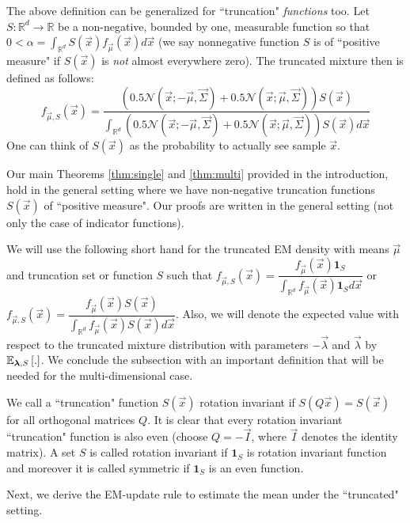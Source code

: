 The above definition can be generalized for ``truncation" \textit{functions} too. Let $S : \mathbb{R}^d \to \mathbb{R}$ be a non-negative, bounded by one, measurable function so that $0< \alpha = \int_{\mathbb{R}^d} S(\vec{x}) f_{\vec{\mu}}(\vec{x})d\vec{x}$ (we say nonnegative function $S$ is of ``positive measure" if $S(\vec{x})$ is \textit{not} almost everywhere zero). The truncated mixture then is defined as follows:
\[f_{\vec{\mu},S}(\vec{x})= \dfrac{(0.5\mathcal{N}(\vec{x};-\vec{\mu},\vec{\Sigma})+0.5\mathcal{N}(\vec{x};\vec{\mu},\vec{\Sigma}))S(\vec{x})}{\int_{\mathbb{R}^d}(0.5\mathcal{N}(\vec{x};-\vec{\mu},\vec{\Sigma})+0.5\mathcal{N}(\vec{x};\vec{\mu},\vec{\Sigma}))S(\vec{x}) d\vec{x}}
\]
One can think of $S(\vec{x})$ as the probability to actually see sample $\vec{x}$.
\begin{remark}
Our main Theorems \ref{thm:single} and \ref{thm:multi} provided in the introduction, hold in the general setting where we have non-negative truncation functions $S(\vec{x})$ of ``positive measure". Our proofs are written in the general setting (not only the case of indicator functions).
\end{remark}

We will use the following short hand for the truncated EM density with means $\vec{\mu}$ and truncation set or function $S$ such that
$f_{\vec{\mu},S}(\vec{x})=\dfrac{f_{\vec{\mu}}(\vec{x}) \mathbf{1}_{S}}{\int_{\mathbb{R}^d} f_{\vec{\mu}}(\vec{x})\mathbf{1}_S d\vec{x}}$ or $f_{\vec{\mu},S}(\vec{x})=\dfrac{f_{\vec{\mu}}(\vec{x}) S(\vec{x})}{\int_{\mathbb{R}^d}f_{\vec{\mu}}(\vec{x})S(\vec{x})d\vec{x}}$. Also, we will denote the expected value with respect to the truncated mixture distribution with parameters $-\vec{\lambda}$ and $\vec{\lambda}$ by $\mathbb{E}_{\bm{\lambda},S}\left[.\right]$.
We conclude the subsection with an important definition that will be needed for the multi-dimensional case.
\begin{definition} We call a ``truncation" function $S(\vec{x})$ rotation invariant if $S(Q\vec{x}) = S(\vec{x})$ for all orthogonal matrices $Q$. It is clear that every rotation invariant ``truncation" function is also even (choose $Q = - \vec{I}$, where $\vec{I}$ denotes the identity matrix). A set $S$ is called rotation invariant if $\mathbf{1}_{S}$ is rotation invariant function and moreover it is called symmetric if $\mathbf{1}_{S}$ is an even function.
\end{definition}

Next, we derive the EM-update rule to estimate the mean under the ``truncated" setting.

